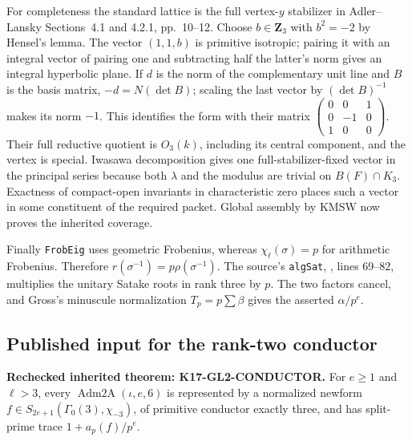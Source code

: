 \documentclass[11pt,a4paper]{article}
\theoremstyle{definition}
\renewcommand{\paragraph}[1]{\par\smallskip\noindent\textbf{#1}\quad\ignorespaces}
\begin{document}
For completeness the standard lattice is the full vertex-$y$
stabilizer in Adler--Lansky Sections~4.1 and 4.2.1, pp.~10--12.
Choose $b\in\mathbf Z_3$ with $b^2=-2$ by Hensel's lemma.
The vector $(1,1,b)$ is primitive isotropic; pairing it with an
integral vector of pairing one and subtracting half the latter's
norm gives an integral hyperbolic plane. If $d$ is the norm of
the complementary unit line and $B$ is the basis matrix,
$-d=N(\det B)$; scaling the last vector by $(\det B)^{-1}$
makes its norm $-1$. This identifies the form with their matrix
$\left(\begin{smallmatrix}0&0&1\\0&-1&0\\1&0&0\end{smallmatrix}\right)$.
Their full reductive quotient is $O_3(k)$, including its central
component, and the vertex is special. Iwasawa decomposition gives
one full-stabilizer-fixed vector in the principal series because
both $\lambda$ and the modulus are trivial on $B(F)\cap K_3$.
Exactness of compact-open invariants in characteristic zero places
such a vector in some constituent of the required packet.
Global assembly by KMSW now proves the inherited coverage.

Finally \texttt{FrobEig} uses geometric Frobenius, whereas
$\chi_\ell(\sigma)=p$ for arithmetic Frobenius.
Therefore $r(\sigma^{-1})=p\rho(\sigma^{-1})$.
The source's \texttt{algSat},
, lines 69--82, multiplies
the unitary Satake roots in rank three by $p$.
The two factors cancel, and Gross's minuscule normalization
$T_p=p\sum\beta$ gives the asserted $\alpha/p^e$.

\subsection{Published input for the rank-two conductor}

\paragraph{Rechecked inherited theorem: K17-GL2-CONDUCTOR.}
For $e\geq1$ and $\ell>3$, every
$\operatorname{Adm2A}(\iota,e,6)$ is represented by a normalized
newform $f\in S_{2e+1}(\Gamma_0(3),\chi_{-3})$, of primitive
conductor exactly three, and has split-prime trace
$1+a_p(f)/p^e$.
\end{document}
